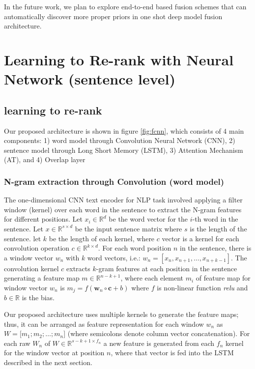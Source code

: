 \documentclass[phd,tocprelim]{cornell}
\begin{document}
In the future work, we plan to explore end-to-end based fusion schemes that can automatically discover more proper priors in one shot deep model fusion architecture. 





\chapter{Learning to Re-rank with Neural Network (sentence level)}

\section{learning to re-rank}

Our proposed architecture is shown in figure \ref{fig:fcnn}, which consists of 4 main components: 1) word model through Convolution Neural Network (CNN), 2) sentence model through Long Short Memory (LSTM), 3) Attention Mechanism (AT), and 4) Overlap layer 
\subsection{N-gram extraction through Convolution (word model)}
The one-dimensional CNN text encoder for NLP task involved applying a filter window (kernel) over each word in the sentence to extract the N-gram features for different positions. Let $x_{i} \in \mathbb{R}^{d}$ be the word vector for the $i$-th word in the sentence. Let $x \in \mathbb{R}^{s\times d}$ be the input sentence matrix where $s$ is the length of the sentence. let $k$ be the length of each kernel, where $c$ vector is a kernel for each convolution operation $c \in \mathbb{R}^{k\times d}$. For each word position $n$ in the sentence, there is a window vector $w_{n}$ with $k$ word vectors, i.e.: $w_{n} =[x_{n}, x_{n+1},\ldots,x_{n+k-1}]$. The convolution kernel $c$ extracts $k$-gram features at each position in the sentence generating a feature map  $m \in \mathbb{R}^{n-k+1}$, where each element $m_{i}$ of feature map for window vector $w_{n}$ is $m_{j}=f\left(\mathbf{w}_{n} \circ \mathbf{c}+b\right)$ where $f$ is non-linear function \textit{relu} \cite{nair2010rectified} and $b \in \mathbb{R}$ is the bias. 

Our proposed architecture uses multiple kernels to generate the feature maps; thus, it can be arranged as feature representation for each window $w_{n}$ as $W = [m_{1};m_{2};\ldots;m_{n}$] (where semicolons denote column vector concatenation). For each raw $W_{n}$ of $W \in \mathbb{R}^{s-k+1\times f_{n}}$ a new feature is generated from each $f_{n}$ kernel for the window vector at position $n$, where that vector is fed into the LSTM described in the next section. 
\end{document}
